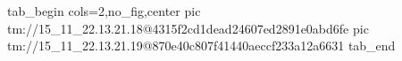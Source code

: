  
 
 
 
 

\qqSecOrig


\ifcmt
  tab_begin cols=2,no_fig,center
    pic tm://15_11_22.13.21.18@4315f2cd1dead24607ed2891e0abd6fe
    pic tm://15_11_22.13.21.19@870e40c807f41440aeccf233a12a6631
  tab_end
\fi

